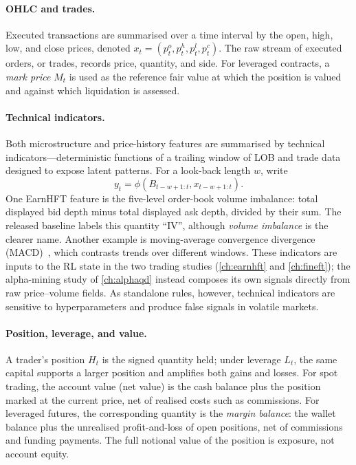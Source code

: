 \paragraph{OHLC and trades.} Executed transactions are summarised over a time interval by the open, high, low, and close prices, denoted $x_t=(p_t^o,p_t^h,p_t^l,p_t^c)$. The raw stream of executed orders, or trades, records price, quantity, and side. For leveraged contracts, a \emph{mark price} $M_t$ is used as the reference fair value at which the position is valued and against which liquidation is assessed.

\paragraph{Technical indicators.} Both microstructure and price-history features are summarised by technical indicators---deterministic functions of a trailing window of LOB and trade data designed to expose latent patterns. For a look-back length $w$, write
\[
y_t=\phi\!\left(B_{t-w+1:t},x_{t-w+1:t}\right).
\]
One EarnHFT feature is the five-level order-book volume imbalance: total displayed bid depth minus total displayed ask depth, divided by their sum. The released baseline labels this quantity ``IV'', although \emph{volume imbalance} is the clearer name. Another example is moving-average convergence divergence (MACD)~\cite{appel2005technical}, which contrasts trends over different windows. These indicators are inputs to the RL state in the two trading studies (\cref{ch:earnhft} and \cref{ch:fineft}); the alpha-mining study of \cref{ch:alphaqd} instead composes its own signals directly from raw price--volume fields. As standalone rules, however, technical indicators are sensitive to hyperparameters and produce false signals in volatile markets.

\paragraph{Position, leverage, and value.} A trader's position $H_t$ is the signed quantity held; under leverage $L_t$, the same capital supports a larger position and amplifies both gains and losses. For spot trading, the account value (net value) is the cash balance plus the position marked at the current price, net of realised costs such as commissions. For leveraged futures, the corresponding quantity is the \emph{margin balance}: the wallet balance plus the unrealised profit-and-loss of open positions, net of commissions and funding payments. The full notional value of the position is exposure, not account equity.

